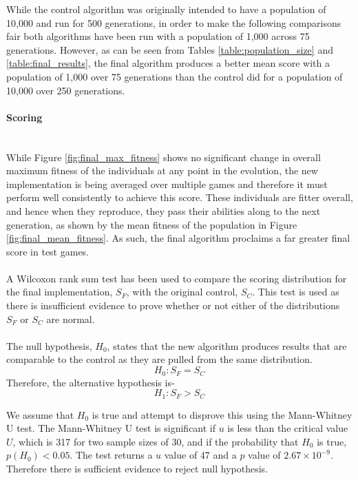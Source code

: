 \documentclass[12pt]{article}
\newcommand{\myparagraph}[1]{\paragraph{#1}\mbox{}\\}
\begin{document}

While the control algorithm was originally intended to have a population of 10,000 and run for 500 generations, in order to make the following comparisons fair both algorithms have been run with a population of 1,000 across 75 generations. However, as can be seen from Tables \ref{table:population_size} and \ref{table:final_results}, the final algorithm produces a better mean score with a population of 1,000 over 75 generations than the control did for a population of 10,000 over 250 generations.
\myparagraph{Scoring}
While Figure \ref{fig:final_max_fitness} shows no significant change in overall maximum fitness of the individuals at any point in the evolution, the new implementation is being averaged over multiple games and therefore it must perform well consistently to achieve this score. These individuals are fitter overall, and hence when they reproduce, they pass their abilities along to the next generation, as shown by the mean fitness of the population in Figure \ref{fig:final_mean_fitness}. As such, the final algorithm proclaims a far greater final score in test games.
\\\\
A Wilcoxon rank sum test has been used to compare the scoring distribution for the final implementation, $S_F$, with the original control, $S_C$. This test is used as there is insufficient evidence to prove whether or not either of the distributions $S_F$ or $S_C$ are normal.
\\\\
The null hypothesis, $H_0$, states that the new algorithm produces results that are comparable to the control as they are pulled from the same distribution.
\[H_0: S_F = S_C\]
Therefore, the alternative hypothesis is-
\[H_1: S_F > S_C\]

We assume that $H_0$ is true and attempt to disprove this using the Mann-Whitney U test. The Mann-Whitney U test is significant if $u$ is less than the critical value $U$, which is 317 for two sample sizes of 30, and if the probability that $H_0$ is true, $p(H_0) < 0.05$. The test returns a $u$ value of 47 and a $p$ value of $2.67 \times 10^{-9}$. Therefore there is sufficient evidence to reject null hypothesis.
\end{document}
